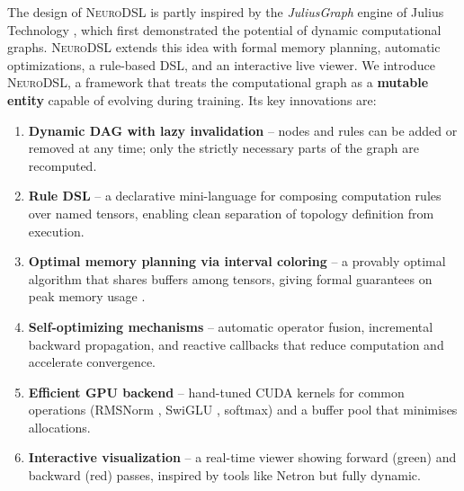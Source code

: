 \documentclass{article}
\begin{document}
The design of \textsc{NeuroDSL} is partly inspired by the \textit{JuliusGraph} engine of Julius Technology \cite{juliustech}, which first demonstrated the potential of dynamic computational graphs. \textsc{NeuroDSL} extends this idea with formal memory planning, automatic optimizations, a rule-based DSL, and an interactive live viewer. We introduce \textsc{NeuroDSL}, a framework that treats the computational graph as a \textbf{mutable entity} capable of evolving during training. Its key innovations are:

\begin{enumerate}
    \item \textbf{Dynamic DAG with lazy invalidation} -- nodes and rules can be added or removed at any time; only the strictly necessary parts of the graph are recomputed.
    \item \textbf{Rule DSL} -- a declarative mini-language for composing computation rules over named tensors, enabling clean separation of topology definition from execution.
    \item \textbf{Optimal memory planning via interval coloring} -- a provably optimal algorithm that shares buffers among tensors, giving formal guarantees on peak memory usage \cite{dilworth}.
    \item \textbf{Self-optimizing mechanisms} -- automatic operator fusion, incremental backward propagation, and reactive callbacks that reduce computation and accelerate convergence.
    \item \textbf{Efficient GPU backend} -- hand-tuned CUDA kernels for common operations (RMSNorm \cite{rmsnorm}, SwiGLU \cite{swiglu}, softmax) and a buffer pool that minimises allocations.
    \item \textbf{Interactive visualization} -- a real-time viewer showing forward (green) and backward (red) passes, inspired by tools like Netron \cite{netron} but fully dynamic.
\end{enumerate}
\end{document}
